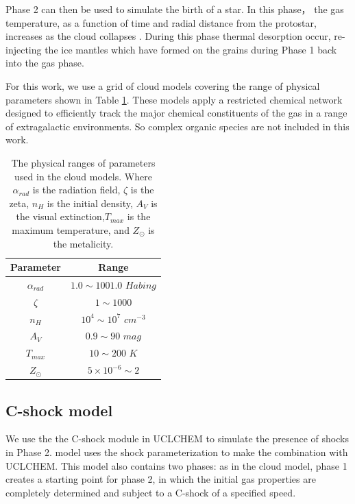 \documentclass{aa}
\begin{document}
\begin{CJK*}{UTF8}{gbsn}
   Phase 2 can then be used to simulate the birth of a star. 
   In this phase， the gas temperature, as a function of time and radial distance from the protostar, increases as the cloud collapses \citep{holdship2017uclchem}. During this phase thermal desorption occur, re-injecting the ice mantles which have formed on the grains during Phase 1 back into the gas phase. 
   
   For this work, we use a grid of cloud models covering the range of physical parameters shown in Table \ref{tab:physparam}. These models apply a restricted chemical network designed to efficiently track the major chemical constituents of the gas in a range of extragalactic environments. So complex organic species are not included in this work. 
   
    \begin{table}[]
    \centering
    \begin{tabular}{cc}
    \hline\hline
    Parameter           & Range               \\
    \hline
    $\alpha _{rad}$                 & $1.0 \sim 1001.0$ $ Habing$ \\
    $\zeta$                         & $1\sim1000 $          \\
    $n_{H}$                         & $10^4\sim10^7$ $cm^{-3}$  \\
    $A_V$                           & $0.9 \sim 90$ $mag$   \\
    $T_{max}$                       & $10 \sim 200 $  $K$   \\
    $Z_{\odot}$                     & $5\times10^{-6} \sim 2  $       \\
    \hline
    \end{tabular}
    \caption{The physical ranges of parameters used in the cloud models. Where $\alpha _{rad}$ is the radiation field, $\zeta$ is the zeta, $n_{H}$ is the initial density, $A_V$ is the visual extinction,$T_{max}$ is the maximum temperature, and $Z_{\odot}$ is the metalicity.}
    \label{tab:physparam}
    \end{table}
   
   
\subsection{C-shock model}

   We use the the C-shock module \citep{jimenez2008parametrization} in UCLCHEM to simulate the presence of shocks in Phase 2. model uses the shock  parameterization \citep{jimenez2008parametrization} to make the combination with UCLCHEM. This model also contains two phases: as in the cloud model, phase 1 creates a starting point for phase 2, in which the initial gas properties are completely determined and subject to a C-shock of a specified speed. 
   

\end{CJK*}
\end{document}
